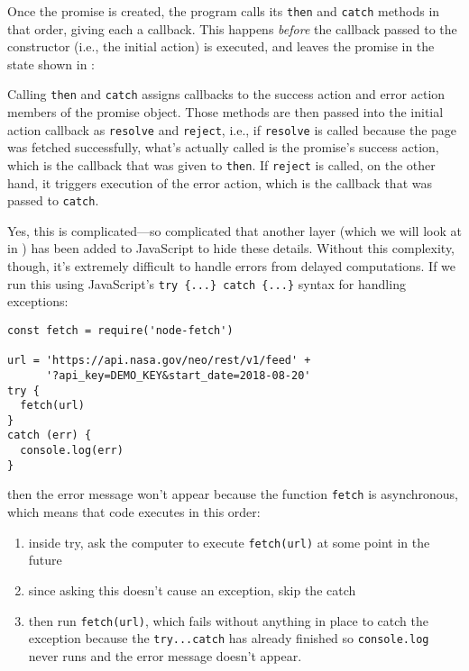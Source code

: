 Once the promise is created,
the program calls its \texttt{then} and \texttt{catch} methods in that order,
giving each a callback.
This happens \emph{before} the callback passed to the constructor
(i.e., the initial action) is executed,
and leaves the promise in the state shown in :


Calling \texttt{then} and \texttt{catch} assigns callbacks to the success action and error action members of the promise object.
Those methods are then passed into the initial action callback as \texttt{resolve} and \texttt{reject},
i.e.,
if \texttt{resolve} is called because the page was fetched successfully,
what's actually called is the promise's success action,
which is the callback that was given to \texttt{then}.
If \texttt{reject} is called,
on the other hand,
it triggers execution of the error action,
which is the callback that was passed to \texttt{catch}.

Yes,
this is complicated---so complicated that another layer
(which we will look at in )
has been added to JavaScript to hide these details.
Without this complexity,
though,
it's extremely difficult to handle errors from delayed computations.
If we run this using JavaScript's \texttt{try\ \{...\}\ catch\ \{...\}} syntax for handling exceptions:

\begin{verbatim}
const fetch = require('node-fetch')

url = 'https://api.nasa.gov/neo/rest/v1/feed' +
      '?api_key=DEMO_KEY&start_date=2018-08-20'
try {
  fetch(url)
}
catch (err) {
  console.log(err)
}
\end{verbatim}

\noindent
then the error message won't appear
because the function \texttt{fetch} is asynchronous,
which means that code executes in this order:

\begin{enumerate}
\item
  inside try, ask the computer to execute \texttt{fetch(url)} at some point in the future
\item
  since asking this doesn't cause an exception, skip the catch
\item
  then run \texttt{fetch(url)},
  which fails without anything in place to catch the exception 
  because the \texttt{try...catch} has already finished 
  so \texttt{console.log} never runs and the error message doesn't appear.
\end{enumerate}

